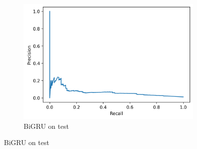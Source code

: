 \documentclass[utf8x]{ctexart}
\begin{document}
\begin{figure}[htb]
\begin{subfigure}[b]{0.32\textwidth}
    \includegraphics[width=\textwidth]{../images/BiGRU_test_prc.png}
    \caption{BiGRU on test}
    \label{fig:BiGRU_prc_test}
  \end{subfigure}



\end{figure}
\end{document}
